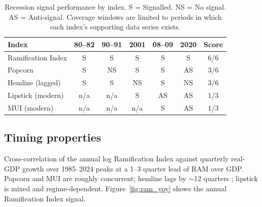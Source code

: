 \documentclass[11pt,a4paper]{article}
\begin{document}
\begin{table}[h]
\centering
\caption{Recession signal performance by index. S = Signalled. NS = No signal. AS = Anti-signal. Coverage windows are limited to periods in which each index's supporting data series exists.}
\label{tab:coverage}
\small
\begin{tabular}{lcccccc}
\toprule
Index & 80--82 & 90--91 & 2001 & 08--09 & 2020 & Score \\
\midrule
Ramification Index & S & S & S & S & S & 6/6 \\
Popcorn   & S & NS & S & S & AS & 3/6 \\
Hemline (lagged) & S & S & NS & S & NS & 3/6 \\
Lipstick (modern) & n/a & n/a & S & AS & AS & 1/3 \\
MUI (modern)      & n/a & n/a & n/a & S & AS & 1/3 \\
\bottomrule
\end{tabular}
\end{table}

\subsection{Timing properties}

Cross-correlation of the annual log Ramification Index against quarterly real-GDP growth over 1985--2024 peaks at a 1--3 quarter lead of RAM over GDP. Popcorn and MUI are roughly concurrent; hemline lags by $\sim$12 quarters \citep{baardwijk2010}; lipstick is mixed and regime-dependent. Figure~\ref{fig:ram_yoy} shows the annual Ramification Index signal.
\end{document}
